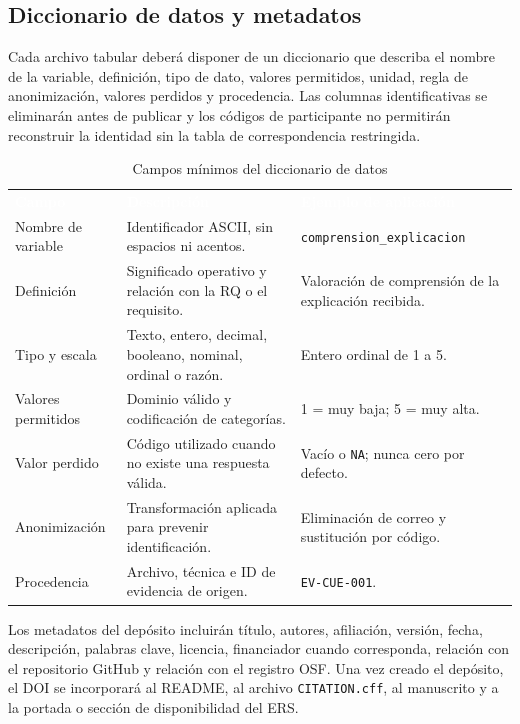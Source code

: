 \documentclass[12pt,a4paper]{article}
\begin{document}
\subsection{Diccionario de datos y metadatos}

Cada archivo tabular deberá disponer de un diccionario que describa el nombre de la variable, definición, tipo de dato, valores permitidos, unidad, regla de anonimización, valores perdidos y procedencia. Las columnas identificativas se eliminarán antes de publicar y los códigos de participante no permitirán reconstruir la identidad sin la tabla de correspondencia restringida.

\begin{table}[H]
\centering
\caption{Campos mínimos del diccionario de datos}
\label{tab:diccionario-datos}
\small
{}
\begin{tabularx}{\textwidth}{L{3.2cm} Y Y}
\textcolor{white}{\textbf{Campo}} &
\textcolor{white}{\textbf{Descripción}} &
\textcolor{white}{\textbf{Ejemplo de aplicación}}\\
Nombre de variable & Identificador ASCII, sin espacios ni acentos. & \nolinkurl{comprension_explicacion}\\
Definición & Significado operativo y relación con la RQ o el requisito. & Valoración de comprensión de la explicación recibida.\\
Tipo y escala & Texto, entero, decimal, booleano, nominal, ordinal o razón. & Entero ordinal de 1 a 5.\\
Valores permitidos & Dominio válido y codificación de categorías. & 1 = muy baja; 5 = muy alta.\\
Valor perdido & Código utilizado cuando no existe una respuesta válida. & Vacío o \nolinkurl{NA}; nunca cero por defecto.\\
Anonimización & Transformación aplicada para prevenir identificación. & Eliminación de correo y sustitución por código.\\
Procedencia & Archivo, técnica e ID de evidencia de origen. & \nolinkurl{EV-CUE-001}.\\
\end{tabularx}
\end{table}

Los metadatos del depósito incluirán título, autores, afiliación, versión, fecha, descripción, palabras clave, licencia, financiador cuando corresponda, relación con el repositorio GitHub y relación con el registro OSF. Una vez creado el depósito, el DOI se incorporará al README, al archivo \nolinkurl{CITATION.cff}, al manuscrito y a la portada o sección de disponibilidad del ERS.
\end{document}
